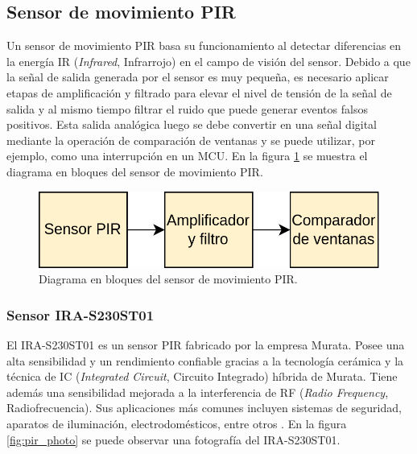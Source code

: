 \subsection{Sensor de movimiento PIR}
Un sensor de movimiento PIR basa su funcionamiento al detectar diferencias en la energía IR (\textit{Infrared}, Infrarrojo) en el campo de visión del sensor. Debido a que la señal de salida generada por el sensor es muy pequeña, es necesario aplicar etapas de amplificación y filtrado para elevar el nivel de tensión de la señal de salida y al mismo tiempo filtrar el ruido que puede generar eventos falsos positivos. Esta salida analógica luego se debe convertir en una señal digital mediante la operación de comparación de ventanas y se puede utilizar, por ejemplo, como una interrupción en un MCU. En la figura \ref{fig:move_blocks} se muestra el diagrama en bloques del sensor de movimiento PIR.

\begin{figure}[h]
	\centering
	\includegraphics[scale=0.25]{./Figures/move_blocks.png}
	\caption{Diagrama en bloques del sensor de movimiento PIR.}
	\label{fig:move_blocks}
\end{figure}

\subsubsection{Sensor IRA-S230ST01}
El IRA-S230ST01 es un sensor PIR fabricado por la empresa Murata. Posee una alta sensibilidad y un rendimiento confiable gracias a la tecnología cerámica y la técnica de IC (\textit{Integrated Circuit}, Circuito Integrado) híbrida de Murata. Tiene además una sensibilidad mejorada a la interferencia de RF (\textit{Radio Frequency}, Radiofrecuencia). Sus aplicaciones más comunes incluyen sistemas de seguridad, aparatos de iluminación, electrodomésticos, entre otros \cite{pir_info}. En la figura \ref{fig:pir_photo} se puede observar una fotografía del IRA-S230ST01.

\vspace*{60 px}

